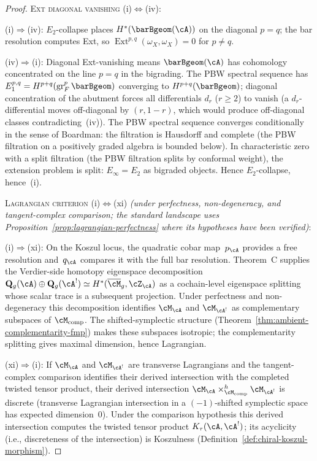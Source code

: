 \begin{proof}
\medskip
\textsc{Ext diagonal vanishing}
\textup{(i)}$\Leftrightarrow$\textup{(iv)}:

\smallskip\noindent
\textup{(i)}$\Rightarrow$\textup{(iv)}:
$E_2$-collapse places $H^*(\barBgeom(\cA))$ on the diagonal
$p = q$; the bar resolution computes Ext, so
$\operatorname{Ext}^{p,q}(\omega_X, \omega_X) = 0$ for $p \neq q$.

\smallskip\noindent
\textup{(iv)}$\Rightarrow$\textup{(i)}:
Diagonal Ext-vanishing means $\barBgeom(\cA)$ has cohomology
concentrated on the line $p = q$ in the bigrading. The PBW
spectral sequence has $E_1^{p,q} = H^{p+q}(\operatorname{gr}_F^p
\barBgeom)$ converging to $H^{p+q}(\barBgeom)$; diagonal
concentration of the abutment forces all differentials
$d_r$ ($r \geq 2$) to vanish (a $d_r$-differential moves
off-diagonal by $(r, 1-r)$, which would produce off-diagonal
classes contradicting~(iv)). The PBW spectral sequence converges
conditionally in the sense of Boardman: the filtration is Hausdorff
and complete (the PBW filtration on a positively graded algebra is
bounded below). In characteristic zero with a split filtration (the
PBW filtration splits by conformal weight), the extension problem is
split: $E_\infty = E_2$ as bigraded objects. Hence
$E_2$-collapse, hence~(i).

\medskip
\textsc{Lagrangian criterion}
\textup{(i)}$\Leftrightarrow$\textup{(xi)}
\emph{(under perfectness, non-degeneracy, and tangent-complex
comparison; the standard landscape uses
Proposition~\textup{\ref{prop:lagrangian-perfectness}} where its
hypotheses have been verified)}:

\smallskip\noindent
\textup{(i)}$\Rightarrow$\textup{(xi)}:
On the Koszul locus, the quadratic cobar map~$p_\cA$ provides a free
resolution and~$q_\cA$ compares it with the full bar resolution.
Theorem~C supplies the Verdier-side homotopy eigenspace
decomposition
$\mathbf{Q}_g(\cA) \oplus \mathbf{Q}_g(\cA^!)
\simeq H^*(\overline{\cM}_g, \cZ_\cA)$
as a cochain-level eigenspace splitting whose scalar trace is a
subsequent projection. Under perfectness and non-degeneracy this
decomposition identifies $\cM_\cA$ and $\cM_{\cA^!}$ as complementary
subspaces of $\cM_{\mathrm{comp}}$. The shifted-symplectic structure
(Theorem~\ref{thm:ambient-complementarity-fmp})
makes these subspaces isotropic; the complementarity splitting
gives maximal dimension, hence Lagrangian.

\smallskip\noindent
\textup{(xi)}$\Rightarrow$\textup{(i)}:
If $\cM_\cA$ and $\cM_{\cA^!}$ are transverse Lagrangians and the
tangent-complex comparison identifies their derived intersection with
the completed twisted tensor product,
their derived intersection
$\cM_\cA \times^h_{\cM_{\mathrm{comp}}} \cM_{\cA^!}$
is discrete (transverse Lagrangian intersection in a $(-1)$-shifted
symplectic space has expected dimension~$0$). Under the comparison
hypothesis this derived intersection computes the twisted tensor product
$K_\tau(\cA, \cA^!)$; its acyclicity (i.e., discreteness of the
intersection) is Koszulness
(Definition~\ref{def:chiral-koszul-morphism}).
\end{proof}

